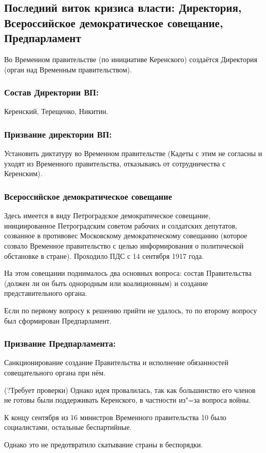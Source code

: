 \subsection{Последний виток кризиса власти: Директория, Всероссийское демократическое совещание, Предпарламент}

Во Временном правительстве (по инициативе Керенского) создаётся Директория (орган над Временным правительством).

\subsubsection{\textbf{Состав Директории ВП:}}

Керенский, Терещенко, Никитин.

\subsubsection{\textbf{Призвание директории ВП:}}

Установить диктатуру во Временном правительстве
(Кадеты с этим не согласны и уходят из Временного правительства, отказываясь от сотрудничества с Керенским).

\subsubsection{\textbf{Всероссийское демократическое совещание}}

Здесь имеется в виду Петроградское демократическое совещание, инициированное Петроградским советом рабочих и солдатских депутатов, созванное в противовес Московскому демократическому совещанию (которое созвало Временное правительство с целью информирования о политической обстановке в стране). Проходило ПДС с 14 сентября 1917 года. 

На этом совещании поднималось два основных вопроса: состав Правительства (должен ли он быть однородным или коалиционным) и создание представительного органа.

Если по первому вопросу к решению прийти не удалось, то по второму вопросу был сформирован Предпарламент.

\subsubsection{\textbf{Призвание Предпарламента:}}
 
Санкционирование создание Правительства и исполнение обязанностей совещательного органа при нём.

(?Требует проверки) Однако идея провалилась, так как большинство его членов не готовы были поддерживать Керенского, в частности из"=за вопроса войны.

К концу сентября из 16 министров Временного правительства 10 было социалистами, остальные беспартийные.

Однако это не предотвратило скатывание страны в беспорядки.
